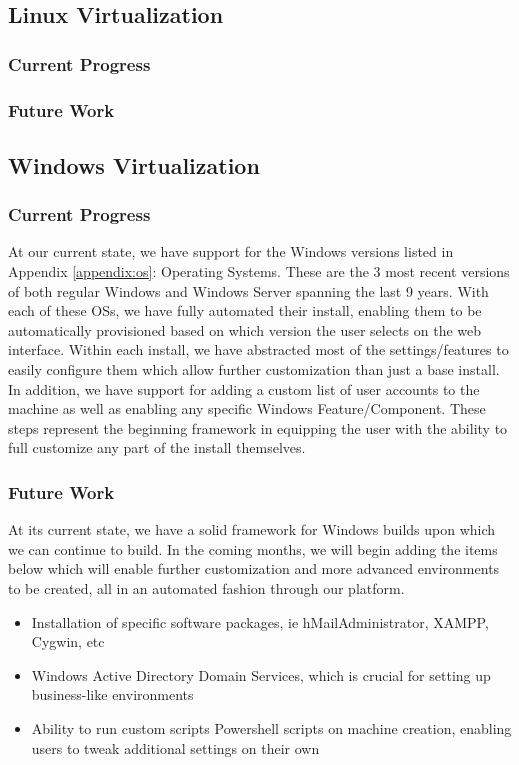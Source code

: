 \documentclass[openright]{report}
\begin{document}
\subsection{Linux Virtualization}

\subsubsection{Current Progress}

\subsubsection{Future Work}

\subsection{Windows Virtualization}

\subsubsection{Current Progress}
At our current state, we have support for the Windows versions listed in Appendix \ref{appendix:os}: Operating Systems. These are the 3 most recent versions of both regular Windows and Windows Server spanning the last 9 years. With each of these OSs, we have fully automated their install, enabling them to be automatically provisioned based on which version the user selects on the web interface. Within each install, we have abstracted most of the settings/features to easily configure them which allow further customization than just a base install. In addition, we have support for adding a custom list of user accounts to the machine as well as enabling any specific Windows Feature/Component. These steps represent the beginning framework in equipping the user with the ability to full customize any part of the install themselves.

\subsubsection{Future Work}
At its current state, we have a solid framework for Windows builds upon which we can continue to build. In the coming months, we will begin adding the items below which will enable further customization and more advanced environments to be created, all in an automated fashion through our platform.
\begin{itemize}
    \item Installation of specific software packages, ie hMailAdministrator, XAMPP, Cygwin, etc
    \item Windows Active Directory Domain Services, which is crucial for setting up business-like environments
    \item Ability to run custom scripts Powershell scripts on machine creation, enabling users to tweak additional settings on their own
\end{itemize}
\end{document}
